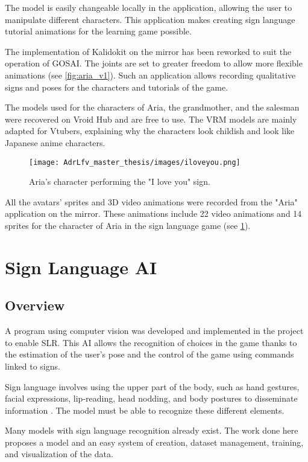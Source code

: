 The model is easily changeable locally in the application, allowing the user to manipulate different characters. This application makes creating sign language tutorial animations for the learning game possible.

The implementation of Kalidokit on the mirror has been reworked to suit the operation of GOSAI. The joints are set to greater freedom to allow more flexible animations (see \ref{fig:aria_v1}).
Such an application allows recording qualitative signs and poses for the characters and tutorials of the game.

The models used for the characters of Aria, the grandmother, and the salesman were recovered on Vroid Hub and are free to use. The VRM models are mainly adapted for Vtubers, explaining why the characters look childish and look like Japanese anime characters.

\begin{figure}[h]
    \centering
    \texttt{[image: AdrLfv\_master\_thesis/images/iloveyou.png]}
    \caption{Aria's character performing the "I love you" sign.}
    \label{fig:iloveyou}
\end{figure}

All the avatars' sprites and 3D video animations were recorded from the "Aria" application on the mirror. These animations include 22 video animations and 14 sprites for the character of Aria in the sign language game (see \ref{fig:iloveyou}).

\section{Sign Language AI}

\subsection{Overview}

A program using computer vision was developed and implemented in the project to enable SLR. This AI allows the recognition of choices in the game thanks to the estimation of the user's pose and the control of the game using commands linked to signs.

Sign language involves using the upper part of the body, such as hand gestures, facial expressions, lip-reading, head nodding, and body postures to disseminate information \cite{adeyanju2021machine}. The model must be able to recognize these different elements.

Many models with sign language recognition already exist. The work done here proposes a model and an easy system of creation, dataset management, training, and visualization of the data.

